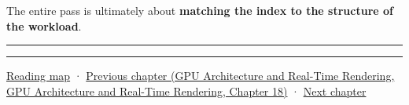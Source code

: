 The entire pass is ultimately about \textbf{matching the index to the structure of the workload}.

\begin{center}\rule{0.5\linewidth}{0.5pt}\end{center}

\begin{center}\rule{0.5\linewidth}{0.5pt}\end{center}

\hyperref[volume-reading-map]{Reading map} · \href{../06-GPU-Architecture-and-Real-Time-Rendering/main.pdf\#nameddest=06-engine-ii-ch027-preparing-and-publishing-runtime-content}{Previous chapter (GPU Architecture and Real-Time Rendering, GPU Architecture and Real-Time Rendering, Chapter 18)} · \hyperref[06-engine-ii-ch029-dynamic-spatial-indices-for-moving-worlds]{Next chapter}
